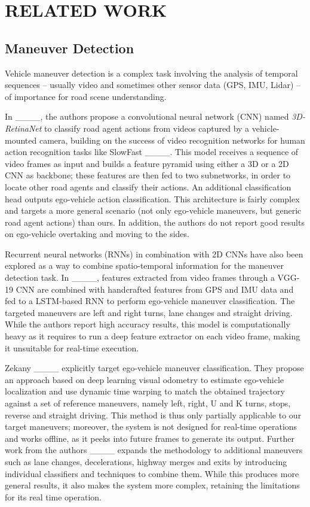 \section{RELATED WORK}
\label{sec:related-works}

\subsection{Maneuver Detection}
Vehicle maneuver detection is a complex task involving the analysis of temporal sequences -- usually video and sometimes other sensor data (GPS, IMU, Lidar) -- of importance for road scene understanding.

In ____, the authors propose a convolutional neural network (CNN) named \emph{3D-RetinaNet} to classify road agent actions from videos captured by a vehicle-mounted camera, building on the success of video recognition networks for human action recognition tasks like SlowFast ____. This model receives a sequence of video frames as input and builds a feature pyramid using either a 3D or a 2D CNN as backbone; these features are then fed to two subnetworks, in order to locate other road agents and classify their actions. An additional classification head outputs ego-vehicle action classification. This architecture is fairly complex and targets a more general scenario (not only ego-vehicle maneuvers, but generic road agent actions) than ours. In addition, the authors do not report good results on ego-vehicle overtaking and moving to the sides.

Recurrent neural networks (RNNs) in combination with 2D CNNs have also been explored as a way to combine spatio-temporal information for the maneuver detection task. In ____, features extracted from video frames through a \mbox{VGG-19} CNN are combined with handcrafted features from GPS and IMU data and fed to a LSTM-based RNN to perform ego-vehicle maneuver classification. The targeted maneuvers are left and right turns, lane changes and straight driving. While the authors report high accuracy results, this model is computationally heavy as it requires to run a deep feature extractor on each video frame, making it unsuitable for real-time execution.

Zekany \etal ____ explicitly target ego-vehicle maneuver classification. They propose an approach based on deep learning visual odometry to estimate ego-vehicle localization and use dynamic time warping to match the obtained trajectory against a set of reference maneuvers, namely left, right, U and K turns, stops, reverse and straight driving. This method is thus only partially applicable to our target maneuvers; moreover, the system is not designed for real-time operations and works offline, as it peeks into future frames to generate its output. Further work from the authors ____ expands the methodology to additional maneuvers such as lane changes, decelerations, highway merges and exits by introducing individual classifiers and techniques to combine them. While this produces more general results, it also makes the system more complex, retaining the limitations for its real time operation.

